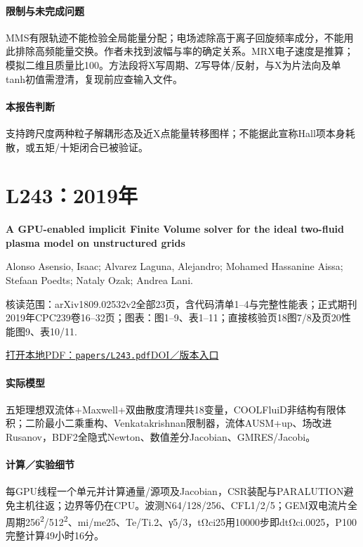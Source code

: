 \paragraph{限制与未完成问题}MMS有限轨迹不能检验全局能量分配；电场滤除高于离子回旋频率成分，不能用此排除高频能量交换。作者未找到波幅与率的确定关系。MRX电子速度是推算；模拟二维且质量比100。方法段将X写周期、Z写导体/反射，与X为片法向及单tanh初值需澄清，复现前应查输入文件。

\paragraph{本报告判断}支持跨尺度两种粒子解耦形态及近X点能量转移图样；不能据此宣称Hall项本身耗散，或五矩/十矩闭合已被验证。

\section{L243：2019年}\label{paper:L243}

\textbf{A GPU-enabled implicit Finite Volume solver for the ideal two-fluid plasma model on unstructured grids}\citep{L243}\

Alonso Asensio,  Isaac;  Alvarez Laguna,  Alejandro;  Mohamed Hassanine Aissa;  Stefaan Poedts;  Nataly Ozak;  Andrea Lani.

\textsf{核读范围：}arXiv1809.02532v2全部23页，含代码清单1–4与完整性能表；正式期刊2019年CPC239卷16–32页；\textsf{图表：}图1–9、表1–11；直接核验页18图7/8及页20性能图9、表10/11.

\href{run:papers/L243.pdf}{打开本地PDF：\texttt{papers/L243.pdf}}\quad\href{https://doi.org/10.1016/j.cpc.2019.01.019}{DOI／版本入口}

\paragraph{实际模型}五矩理想双流体+Maxwell+双曲散度清理共18变量，COOLFluiD非结构有限体积；二阶最小二乘重构、Venkatakrishnan限制器，流体AUSM+up、场改进Rusanov，BDF2全隐式Newton、数值差分Jacobian、GMRES/Jacobi。

\paragraph{计算／实验细节}每GPU线程一个单元并计算通量/源项及Jacobian，CSR装配与PARALUTION避免主机往返；边界等仍在CPU。波测N64/128/256、CFL1/2/5；GEM双电流片全周期256\textsuperscript{2}/512\textsuperscript{2}、mi/me25、Te/Ti.2、γ5/3，tΩci25用10000步即dtΩci.0025，P100完整计算49小时16分。

